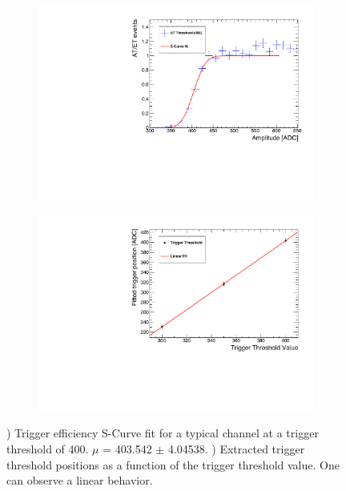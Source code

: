 \begin{figure}[htbp!]
  \centering
  \begin{subfigure}[t]{0.49\textwidth}
    \includegraphics[width=1.\linewidth]{chap4/fig_Commi/EfficiencyCurveFit_HBU2_12.pdf}
    \caption{} \label{fig:EffiCurve}
  \end{subfigure}
  \hfill
  \begin{subfigure}[t]{0.49\textwidth}
    \includegraphics[width=1.\linewidth]{chap4/fig_Commi/TriggerThresholdFit_HBU2_12.pdf}
    \caption{} \label{fig:TriggerFit}
  \end{subfigure}
  \caption{) Trigger efficiency S-Curve fit for a typical channel at a trigger threshold of 400. $\mu$ = 403.542 $\pm$ 4.04538. ) Extracted trigger threshold positions as a function of the trigger threshold value. One can observe a linear behavior.}
\end{figure}

